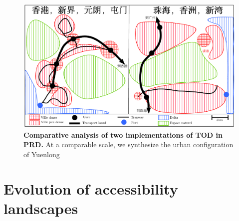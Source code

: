 \begin{figure}
	\includegraphics[width=\linewidth]{figures/1-3-1-fig-qualitative-schema.pdf}
	\caption{\textbf{Comparative analysis of two implementations of TOD in PRD.} At a comparable scale, we synthesize the urban configuration of Yuenlong}
\end{figure}




\section{Evolution of accessibility landscapes}




